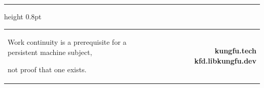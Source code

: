 \documentclass[10pt]{article}
\begin{document}
\vfill
{\color{Jade}\hrule height 0.8pt}
\vspace{0.14in}
\begin{tabularx}{\textwidth}{@{}Xr@{}}
  {\sffamily\footnotesize\color{PaperCool}
  Work continuity is a prerequisite for a persistent machine subject,\par
  not proof that one exists.} &
  {\sffamily\bfseries\footnotesize\color{Cyan}
  kungfu.tech \textperiodcentered{} kfd.libkungfu.dev}
\end{tabularx}
\end{document}

